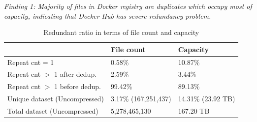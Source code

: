 \textit{Finding 1: Majority of files in Docker registry are
duplicates which occupy most of capacity, indicating that Docker Hub has severe
redundancy problem.}


\begin{table} 
	\centering 
	\scriptsize  
	\caption{Redundant ratio in terms of file count and capacity} \label{tbl:overall-redundant_ratio} 
	\begin{tabular}{|l|l|l|}%
		\hline  
		       & File count & Capacity \\
		\hline
		Repeat cnt = 1 & 0.58\% & 10.87\%\\
		\hline
		Repeat cnt $>$ 1 after dedup. & 2.59\% & 3.44\%\\
		\hline
		Repeat cnt $>$ 1 before dedup.  & 99.42\%  & 89.13\%\\
		\hline
		Unique dataset (Uncompressed) & 3.17\% (167,251,437)  &  14.31\% (23.92 TB) \\
		\hline 
		Total dataset (Uncompressed) & 5,278,465,130 & 167.20 TB \\
		\hline 	
	\end{tabular} 
\end{table} 


